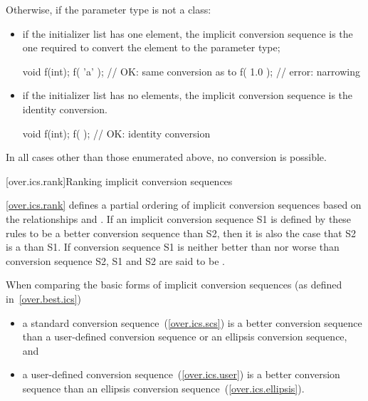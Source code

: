 \pnum
Otherwise, if the parameter type is not a class:

\begin{itemize}
\item if the initializer list has one element, the implicit conversion sequence
is the one required to convert the element to the parameter type; \enterexample
\begin{codeblock}
void f(int);
f( {'a'} );                 // OK: same conversion as  to 
f( {1.0} );                 // error: narrowing
\end{codeblock}
\exitexample

\item if the initializer list has no elements, the implicit conversion sequence
is the identity conversion. \enterexample
\begin{codeblock}
void f(int);
f( { } );                   // OK: identity conversion 
\end{codeblock}
\exitexample
\end{itemize}

\pnum
In all cases other than those enumerated above, no conversion is possible.

[over.ics.rank]{Ranking implicit conversion sequences}

\pnum
\ref{over.ics.rank} defines a partial ordering of implicit conversion
sequences based on the relationships
and
.
If an implicit conversion sequence S1 is
defined by these rules to be a better conversion sequence than
S2, then it is also the case that S2 is a
than S1.
If conversion sequence S1 is neither better
than nor worse than conversion sequence S2, S1 and S2 are said to
be
.

\pnum
When comparing the basic forms of implicit conversion sequences
(as defined in~\ref{over.best.ics})

\begin{itemize}
\item
a standard conversion sequence~(\ref{over.ics.scs}) is a better
conversion sequence than a user-defined conversion sequence
or an ellipsis conversion sequence, and
\item
a user-defined conversion sequence~(\ref{over.ics.user}) is a
better conversion sequence than an ellipsis conversion
sequence~(\ref{over.ics.ellipsis}).
\end{itemize}

